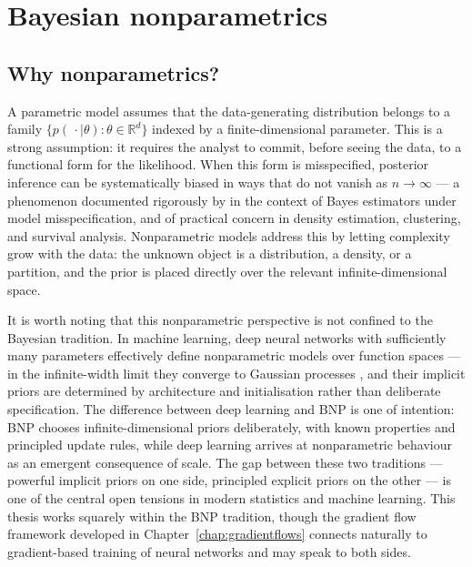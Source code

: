 \section{Bayesian nonparametrics}
\label{sec:intro:bnp}

\subsection{Why nonparametrics?}
\label{subsec:intro:whybnp}

A parametric model assumes that the data-generating distribution belongs
to a family $\{p(\,\cdot\mid\theta) : \theta \in \mathbb{R}^d\}$ indexed
by a finite-dimensional parameter.  This is a strong assumption: it
requires the analyst to commit, before seeing the data, to a functional
form for the likelihood.  When this form is misspecified, posterior
inference can be systematically biased in ways that do not vanish as $n
\to \infty$ --- a phenomenon documented rigorously by \citet{Freedman1963}
in the context of Bayes estimators under model misspecification, and of
practical concern in density estimation, clustering, and survival
analysis.  Nonparametric models address this by letting complexity grow
with the data: the unknown object is a distribution, a density, or a
partition, and the prior is placed directly over the relevant
infinite-dimensional space.

It is worth noting that this nonparametric perspective is not confined to
the Bayesian tradition.  In machine learning, deep neural networks with
sufficiently many parameters effectively define nonparametric models over
function spaces --- in the infinite-width limit they converge to Gaussian
processes \citep{Neal1996, LeeEtAl2018}, and their implicit priors are
determined by architecture and initialisation rather than deliberate
specification.  The difference between deep learning and BNP is one of
intention: BNP chooses infinite-dimensional priors deliberately, with
known properties and principled update rules, while deep learning arrives
at nonparametric behaviour as an emergent consequence of scale.  The gap
between these two traditions --- powerful implicit priors on one side,
principled explicit priors on the other --- is one of the central open
tensions in modern statistics and machine learning.  This thesis works
squarely within the BNP tradition, though the gradient flow framework
developed in Chapter~\ref{chap:gradientflows} connects naturally to
gradient-based training of neural networks and may speak to both sides.

